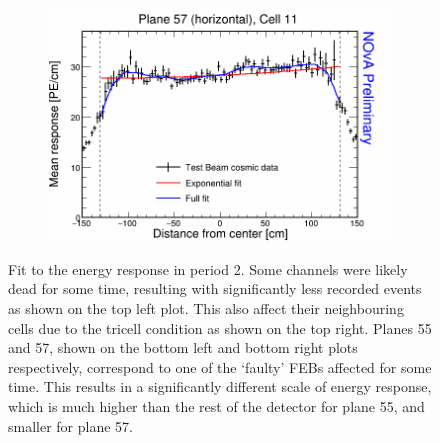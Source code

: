 \begin{figure}[!hbtp]
\begin{subfigure}{0.495\textwidth}
  \end{subfigure}
  \begin{subfigure}{0.495\textwidth}
    \includegraphics[width=\linewidth]{Plots/RelativeCalibrationResults/p2_057_011.png}
  \end{subfigure}
  \caption[Attenuation fits for cells with readout issues in period 2 data]{Fit to the energy response in period 2. Some channels were likely dead for some time, resulting with significantly less recorded events as shown on the top left plot. This also affect their neighbouring cells due to the tricell condition as shown on the top right. Planes 55 and 57, shown on the bottom left and bottom right plots respectively, correspond to one of the `faulty' \glspl{FEB} affected for some time. This results in a significantly different scale of energy response, which is much higher than the rest of the detector for plane 55, and smaller for plane 57.}
  \label{fig:AttenfitResultsPeriod2_ReadoutIssues}
\end{figure}

